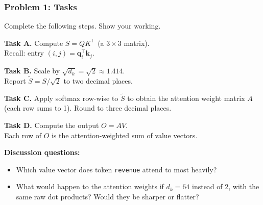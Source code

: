 \documentclass[9pt,t]{beamer}
\begin{document}
\begin{frame}
\frametitle{Problem 1: Tasks}

Complete the following steps. Show your working.

\medskip
\textbf{Task A.} Compute $S = QK^\top$ (a $3 \times 3$ matrix).\\
Recall: entry $(i,j) = \mathbf{q}_i^\top \mathbf{k}_j$.

\medskip
\textbf{Task B.} Scale by $\sqrt{d_k} = \sqrt{2} \approx 1.414$.\\
Report $\tilde{S} = S / \sqrt{2}$ to two decimal places.

\medskip
\textbf{Task C.} Apply softmax row-wise to $\tilde{S}$ to obtain the attention weight
matrix $A$ (each row sums to 1). Round to three decimal places.

\medskip
\textbf{Task D.} Compute the output $O = AV$.\\
Each row of $O$ is the attention-weighted sum of value vectors.

\medskip
\textbf{Discussion questions:}
\begin{itemize}
  \item Which value vector does token \texttt{revenue} attend to most heavily?
  \item What would happen to the attention weights if $d_k = 64$ instead of 2,
        with the same raw dot products? Would they be sharper or flatter?
\end{itemize}
\end{frame}
\end{document}
